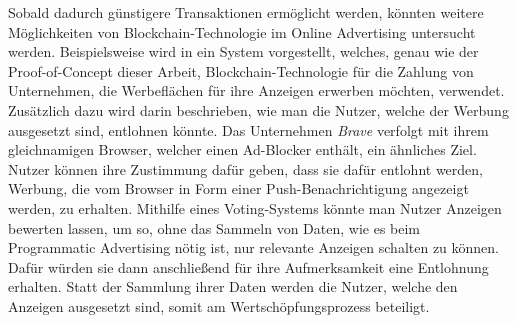 Sobald dadurch günstigere Transaktionen ermöglicht werden, könnten weitere Möglichkeiten von Blockchain-Technologie im Online Advertising untersucht werden. Beispielsweise wird in \cite{ding_2021} ein System vorgestellt, welches, genau wie der Proof-of-Concept dieser Arbeit, Blockchain-Technologie für die Zahlung von Unternehmen, die Werbeflächen für ihre Anzeigen erwerben möchten, verwendet. Zusätzlich dazu wird darin beschrieben, wie man die Nutzer, welche der Werbung ausgesetzt sind, entlohnen könnte. Das Unternehmen \emph{Brave} verfolgt mit ihrem gleichnamigen Browser, welcher einen Ad-Blocker enthält, ein ähnliches Ziel. Nutzer können ihre Zustimmung dafür geben, dass sie dafür entlohnt werden, Werbung, die vom Browser in Form einer Push-Benachrichtigung angezeigt werden, zu erhalten. Mithilfe eines Voting-Systems könnte man Nutzer Anzeigen bewerten lassen, um so, ohne das Sammeln von Daten, wie es beim Programmatic Advertising nötig ist, nur relevante Anzeigen schalten zu können. Dafür würden sie dann anschließend für ihre Aufmerksamkeit eine Entlohnung erhalten. Statt der Sammlung ihrer Daten werden die Nutzer, welche den Anzeigen ausgesetzt sind, somit am Wertschöpfungsprozess beteiligt.


